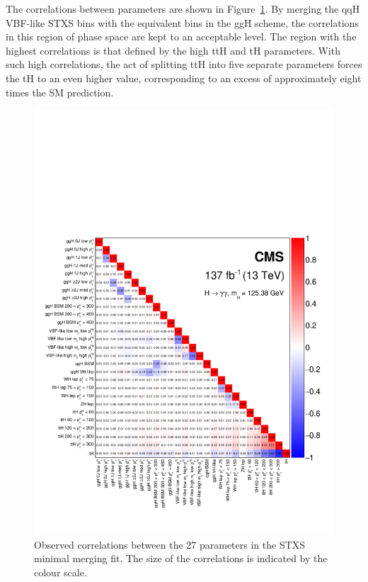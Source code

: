 The correlations between parameters are shown in Figure~\ref{fig:stage1p2_minimal_correlations}. By merging the qqH VBF-like STXS bins with the equivalent bins in the ggH scheme, the correlations in this region of phase space are kept to an acceptable level. The region with the highest correlations is that defined by the high \ptH ttH and tH parameters. With such high correlations, the act of splitting ttH into five separate parameters forces the tH \xsbr to an even higher value, corresponding to an excess of approximately eight times the SM prediction. 


\begin{figure}[htb!]
  \centering
  \includegraphics[width=1\textwidth]{Figures/hgg_results/stage1p2_minimal_correlations.pdf}
  \caption[Correlations in the minimal merging parameters]
  {
    Observed correlations between the 27 parameters in the STXS minimal merging fit. The size of the correlations is indicated by the colour scale.
  }
  \label{fig:stage1p2_minimal_correlations}
\end{figure}


